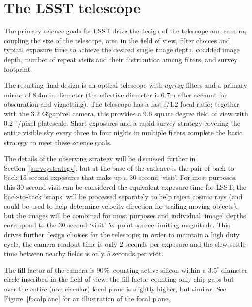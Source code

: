 \documentclass{iau}
\begin{document}

\section{The LSST telescope}

The primary science goals for LSST drive the design of the telescope
and camera, coupling the size of the telescope, area in the field of
view, filter choices and typical exposure time to achieve the desired
single image depth, coadded image depth, number of repeat visits and
their distribution among filters, and survey footprint.

The resulting final design is an optical telescope with
$ugrizy$ filters and a primary mirror of 8.4m in
diameter (the effective diameter is 6.7m after account for obscuration
and vignetting). The telescope has a fast f/1.2 focal ratio; together
with the 3.2 Gigapixel camera, this provides a 9.6 square degree field
of view with 0.2 ''/pixel platescale. Short exposures and a rapid
survey strategy covering the entire visible sky every three to four
nights in multiple filters complete the basic strategy to meet these
science goals.

The details of the observing strategy will be discussed further in
Section~\ref{surveystrategy}, but at the base of the cadence is the
pair of back-to-back 15 second exposures that make up a 30 second
`visit'. For most purposes, this 30 second visit can be considered the
equivalent exposure time for LSST; the back-to-back `snaps' will be
processed separately to help reject cosmic rays (and could be used to
help determine velocity direction for trailing moving objects), but
the images will be combined for most purposes and individual `image'
depths correspond to the 30 second `visit' $5\sigma$ point-source
limiting magnitude. This drives further design choices for the
telescope; in order to maintain a high duty cycle, the camera readout time
is only 2 seconds per exposure and the slew-settle time between
nearby fields is only 5 seconds per visit.

The fill factor of the camera is 90\%, counting active silicon within
a $3.5^\circ$ diameter circle inscribed in the field of view; the fill
factor counting only chip gaps but over the entire (non-circular)
focal plane is slightly higher, but similar. See
Figure~\ref{focalplane} for an illustration of the focal plane.
\end{document}
